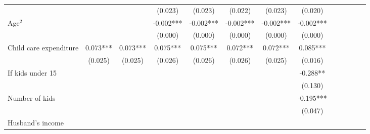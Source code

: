 \begin{center}
\begin{table}[th]
{\begin{tabular}{lcccccccccccc}
\multicolumn{1}{l}{} &
  \multicolumn{1}{c}{} &
  \multicolumn{1}{c}{} &
  \multicolumn{1}{c}{(0.023)} &
  \multicolumn{1}{c}{(0.023)} &
  \multicolumn{1}{c}{(0.022)} &
  \multicolumn{1}{c}{(0.023)} &
  \multicolumn{1}{c}{(0.020)} \\
\multicolumn{1}{l}{Age$^2$} &
  \multicolumn{1}{c}{} &
  \multicolumn{1}{c}{} &
  \multicolumn{1}{c}{-0.002***} &
  \multicolumn{1}{c}{-0.002***} &
  \multicolumn{1}{c}{-0.002***} &
  \multicolumn{1}{c}{-0.002***} &
  \multicolumn{1}{c}{-0.002***} \\
\multicolumn{1}{l}{} &
  \multicolumn{1}{c}{} &
  \multicolumn{1}{c}{} &
  \multicolumn{1}{c}{(0.000)} &
  \multicolumn{1}{c}{(0.000)} &
  \multicolumn{1}{c}{(0.000)} &
  \multicolumn{1}{c}{(0.000)} &
  \multicolumn{1}{c}{(0.000)} \\
\multicolumn{1}{l}{Child care expenditure} &
  \multicolumn{1}{c}{0.073***} &
  \multicolumn{1}{c}{0.073***} &
  \multicolumn{1}{c}{0.075***} &
  \multicolumn{1}{c}{0.075***} &
  \multicolumn{1}{c}{0.072***} &
  \multicolumn{1}{c}{0.072***} &
  \multicolumn{1}{c}{0.085***} \\
\multicolumn{1}{l}{} &
  \multicolumn{1}{c}{(0.025)} &
  \multicolumn{1}{c}{(0.025)} &
  \multicolumn{1}{c}{(0.026)} &
  \multicolumn{1}{c}{(0.026)} &
  \multicolumn{1}{c}{(0.026)} &
  \multicolumn{1}{c}{(0.025)} &
  \multicolumn{1}{c}{(0.016)} \\
\multicolumn{1}{l}{If kids under 15} &
  \multicolumn{1}{c}{} &
  \multicolumn{1}{c}{} &
  \multicolumn{1}{c}{} &
  \multicolumn{1}{c}{} &
  \multicolumn{1}{c}{} &
  \multicolumn{1}{c}{} &
  \multicolumn{1}{c}{-0.288**} \\
\multicolumn{1}{l}{} &
  \multicolumn{1}{c}{} &
  \multicolumn{1}{c}{} &
  \multicolumn{1}{c}{} &
  \multicolumn{1}{c}{} &
  \multicolumn{1}{c}{} &
  \multicolumn{1}{c}{} &
  \multicolumn{1}{c}{(0.130)} \\
\multicolumn{1}{l}{Number of kids} &
  \multicolumn{1}{c}{} &
  \multicolumn{1}{c}{} &
  \multicolumn{1}{c}{} &
  \multicolumn{1}{c}{} &
  \multicolumn{1}{c}{} &
  \multicolumn{1}{c}{} &
  \multicolumn{1}{c}{-0.195***} \\
\multicolumn{1}{l}{} &
  \multicolumn{1}{c}{} &
  \multicolumn{1}{c}{} &
  \multicolumn{1}{c}{} &
  \multicolumn{1}{c}{} &
  \multicolumn{1}{c}{} &
  \multicolumn{1}{c}{} &
  \multicolumn{1}{c}{(0.047)} \\
\multicolumn{1}{l}{Husband's income} &
  \multicolumn{1}{c}{} &
  \multicolumn{1}{c}{} &
  \multicolumn{1}{c}{} &
  \multicolumn{1}{c}{} &

\end{tabular}}
\end{table}
\end{center}
